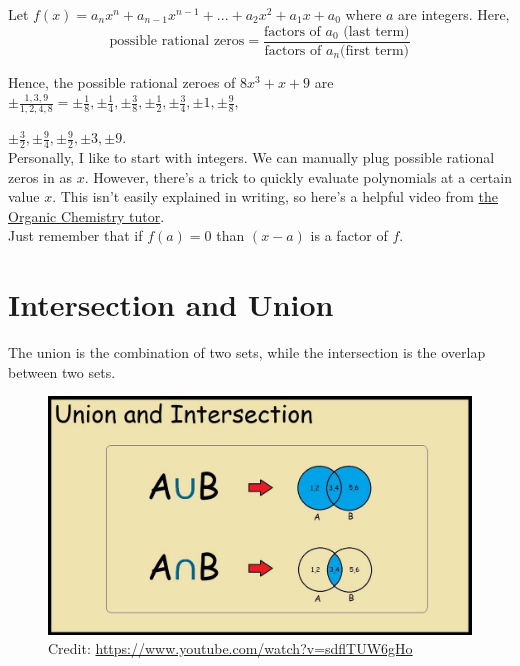 \documentclass[12pt]{article}
\begin{document}
Let \(f(x)=a_nx^n+a_{n-1}x^{n-1}+...+a_2x^2+a_1x+a_0\) where  \(a\) are integers. Here,\\

\[\text{possible rational zeros}=\frac{\text{factors of }a_0\text{ (last term)}}{\text{factors of }a_n\text{(first term)}}\]

Hence, the possible rational zeroes of \(8x^3+x+9\) are \(\pm\frac{1,3,9}{1,2,4,8}=\pm\frac{1}{8},\pm\frac{1}{4}, \pm\frac{3}{8},\pm\frac{1}{2}, \pm\frac{3}{4},\pm1, \pm\frac{9}{8},\)

\(\pm\frac{3}{2}, \pm\frac{9}{4}, \pm\frac{9}{2},\pm3, \pm9\).\\


Personally, I like to start with integers. We can manually plug possible rational zeros in as \(x\). However, there's a trick to quickly evaluate polynomials at a certain value \(x\). This isn't easily explained in writing, so here's a helpful video from \href{https://www.youtube.com/watch?app=desktop&v=FxHWoUOq2iQ}{the Organic Chemistry tutor}. \\

Just remember that if \(f(a)=0\) than \((x-a)\) is a factor of \(f\).\\

\section{Intersection and Union}

The union is the combination of two sets, while the intersection is the overlap between two sets.\\

\begin{figure}[ht]
	\centering
	\includegraphics[scale=0.25]{intun}
	\caption{Credit: \url{https://www.youtube.com/watch?v=sdflTUW6gHo}}
\end{figure}
\end{document}
